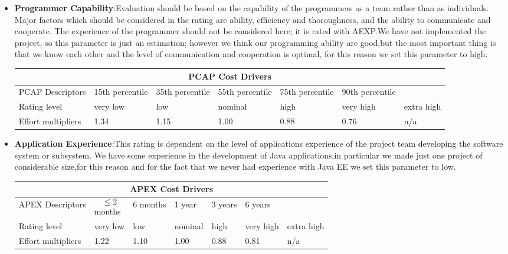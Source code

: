 \begin{itemize}
\item \textbf{Programmer Capability}:Evaluation should be based on the capability of the programmers as a team rather than as individuals. Major factors which should be considered in the rating are ability, efficiency and thoroughness, and the ability to communicate and cooperate. The experience of the programmer should not be considered here; it is rated with AEXP.We have not implemented the project, so this parameter is just an estimation; however we think our programming ability are good,but the most important thing is that we know each other and the level of communication and cooperation is optimal, for this reason we set this parameter to high.

\begin{longtable}{| m{}| m{} | m{} | m{} | m{} | m{} | m{}| }
\hline
\multicolumn{7}{c}{PCAP Cost Drivers}\\
\hline
\hline
PCAP Descriptors & 15th percentile  & 35th percentile & 55th percentile & 75th percentile & 90th percentile & \\
\hline
Rating level & very low & low & nominal & high & very high & extra high \\
\hline
Effort multipliers & 1.34 & 1.15 & 1.00 & 0.88 & 0.76 & n/a \\
\hline
\end{longtable}

\item\textbf{Application Experience}:This rating is dependent on the level of applications experience of the project team developing the software system or subsystem. We have some experience in the development of Java applications,in particular we made just one project of considerable size,for this reason and for the fact that we never had experience with Java EE we set this parameter to low.

\begin{longtable}{| m{}| m{} | m{} | m{} | m{} | m{} | m{}| }
\hline
\multicolumn{7}{c}{APEX Cost Drivers}\\
\hline
\hline
APEX Descriptors & \begin{equation*}
{\le 2}
\end{equation*} months  & 6 months & 1 year & 3 years & 6 years & \\
\hline
Rating level & very low & low & nominal & high & very high & extra high \\
\hline
Effort multipliers & 1.22 & 1.10 & 1.00 & 0.88 & 0.81 & n/a \\
\hline
\end{longtable}


\end{itemize}
